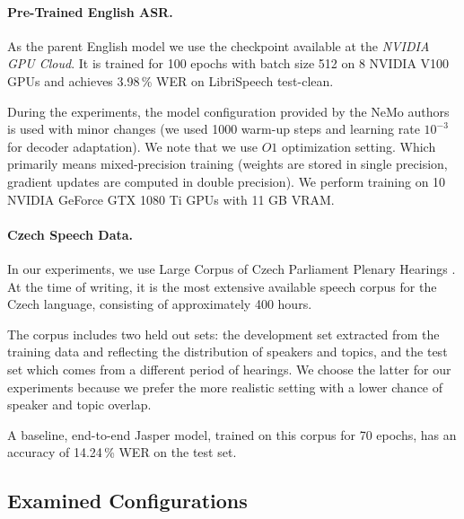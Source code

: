 
\paragraph{Pre-Trained English ASR.}

As the parent English model we use the checkpoint available at the \textit{NVIDIA GPU Cloud}. It is trained for 100 epochs with batch size 512 on 8 NVIDIA V100 GPUs and achieves 3.98\,\% WER on LibriSpeech  test-clean.

During the experiments, the model configuration provided by the NeMo authors is used with minor changes (we used 1000 warm-up steps and learning rate $10^{-3}$ for decoder adaptation). We note that we use $O1$ optimization setting. Which primarily means mixed-precision training (weights are stored in single precision, gradient updates are computed in double precision). We perform training on 10 NVIDIA GeForce GTX 1080 Ti GPUs with 11 GB VRAM.


\paragraph{Czech Speech Data.}
In our experiments, we use Large Corpus of Czech Parliament Plenary Hearings . At the time of writing, it is the most extensive available speech corpus for the Czech language, consisting of approximately 400 hours.

The corpus includes two held out sets: the development set extracted from the training data and reflecting the distribution of speakers and topics, and the test set which comes from a different period of hearings. We choose the latter for our experiments because we prefer the more realistic setting with a lower chance of speaker and topic overlap.

A baseline, end-to-end Jasper model, trained on this corpus for 70 epochs, has an accuracy of 14.24\,\% WER on the test set.


\subsection{Examined Configurations}
\label{sec:experiments}



